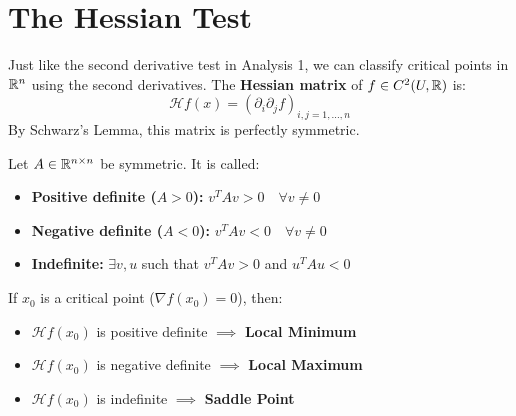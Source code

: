 \section{The Hessian Test}

Just like the second derivative test in Analysis 1, we can classify critical points in $\mathbb{R}^n$ using the second derivatives. The \textbf{Hessian matrix} of $f \in C^2(U, \mathbb{R})$ is:
\[ \mathscr{H}f(x) = (\partial_i \partial_j f)_{i,j=1,\dots,n} \]
By Schwarz's Lemma, this matrix is perfectly symmetric.

\begin{definition*}
Let $A \in \mathbb{R}^{n \times n}$ be symmetric. It is called:
\begin{itemize}
    \item \textbf{Positive definite ($A > 0$):} $v^T A v > 0 \quad \forall v \ne 0$
    \item \textbf{Negative definite ($A < 0$):} $v^T A v < 0 \quad \forall v \ne 0$
    \item \textbf{Indefinite:} $\exists v, u$ such that $v^T A v > 0$ and $u^T A u < 0$
\end{itemize}
\end{definition*}

If $x_0$ is a critical point ($\nabla f(x_0) = 0$), then:
\begin{itemize}
    \item $\mathscr{H}f(x_0)$ is positive definite $\implies$ \textcolor{eDarkGreen}{\textbf{Local Minimum}}
    \item $\mathscr{H}f(x_0)$ is negative definite $\implies$ \textcolor{eDarkRed}{\textbf{Local Maximum}}
    \item $\mathscr{H}f(x_0)$ is indefinite $\implies$ \textcolor{eSaddleBrown}{\textbf{Saddle Point}}
\end{itemize}

